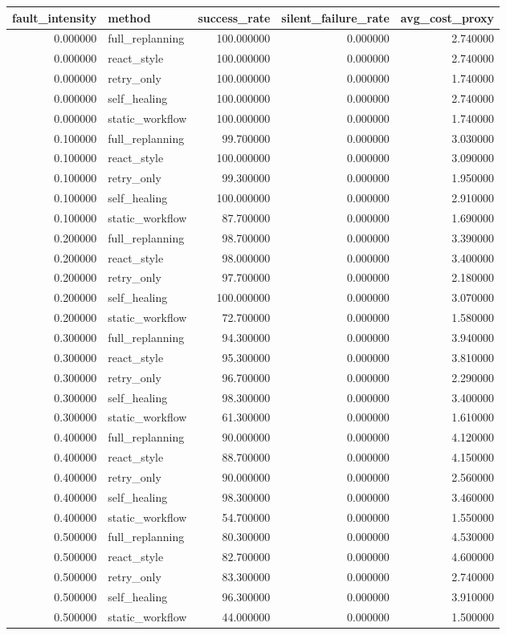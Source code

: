 \begin{tabular}{rlrrr}
\toprule
fault_intensity & method & success_rate & silent_failure_rate & avg_cost_proxy \\
\midrule
0.000000 & full_replanning & 100.000000 & 0.000000 & 2.740000 \\
0.000000 & react_style & 100.000000 & 0.000000 & 2.740000 \\
0.000000 & retry_only & 100.000000 & 0.000000 & 1.740000 \\
0.000000 & self_healing & 100.000000 & 0.000000 & 2.740000 \\
0.000000 & static_workflow & 100.000000 & 0.000000 & 1.740000 \\
0.100000 & full_replanning & 99.700000 & 0.000000 & 3.030000 \\
0.100000 & react_style & 100.000000 & 0.000000 & 3.090000 \\
0.100000 & retry_only & 99.300000 & 0.000000 & 1.950000 \\
0.100000 & self_healing & 100.000000 & 0.000000 & 2.910000 \\
0.100000 & static_workflow & 87.700000 & 0.000000 & 1.690000 \\
0.200000 & full_replanning & 98.700000 & 0.000000 & 3.390000 \\
0.200000 & react_style & 98.000000 & 0.000000 & 3.400000 \\
0.200000 & retry_only & 97.700000 & 0.000000 & 2.180000 \\
0.200000 & self_healing & 100.000000 & 0.000000 & 3.070000 \\
0.200000 & static_workflow & 72.700000 & 0.000000 & 1.580000 \\
0.300000 & full_replanning & 94.300000 & 0.000000 & 3.940000 \\
0.300000 & react_style & 95.300000 & 0.000000 & 3.810000 \\
0.300000 & retry_only & 96.700000 & 0.000000 & 2.290000 \\
0.300000 & self_healing & 98.300000 & 0.000000 & 3.400000 \\
0.300000 & static_workflow & 61.300000 & 0.000000 & 1.610000 \\
0.400000 & full_replanning & 90.000000 & 0.000000 & 4.120000 \\
0.400000 & react_style & 88.700000 & 0.000000 & 4.150000 \\
0.400000 & retry_only & 90.000000 & 0.000000 & 2.560000 \\
0.400000 & self_healing & 98.300000 & 0.000000 & 3.460000 \\
0.400000 & static_workflow & 54.700000 & 0.000000 & 1.550000 \\
0.500000 & full_replanning & 80.300000 & 0.000000 & 4.530000 \\
0.500000 & react_style & 82.700000 & 0.000000 & 4.600000 \\
0.500000 & retry_only & 83.300000 & 0.000000 & 2.740000 \\
0.500000 & self_healing & 96.300000 & 0.000000 & 3.910000 \\
0.500000 & static_workflow & 44.000000 & 0.000000 & 1.500000 \\
\bottomrule
\end{tabular}
